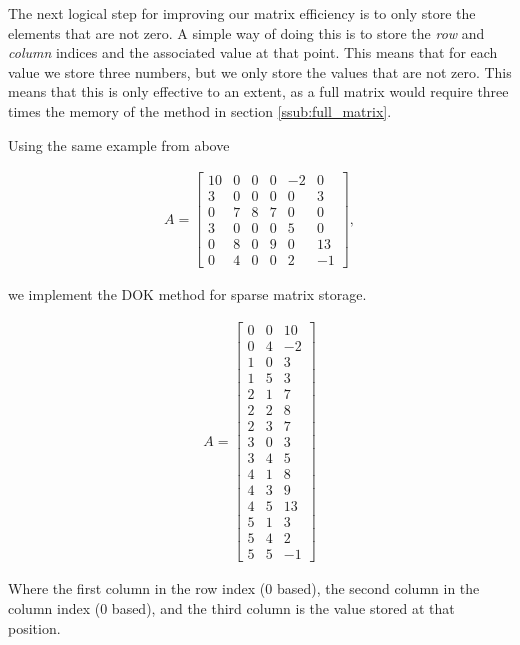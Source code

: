 \documentclass[../fem.tex]{subfiles}
\begin{document}
The next logical step for improving our matrix efficiency is to only store the
elements that are not zero. A simple way of doing this is to store the
\textit{row} and \textit{column} indices and the associated value at that
point. This means that for each value we store three numbers, but we only store
the values that are not zero. This means that this is only effective to an
extent, as a full matrix would require three times the memory of the method in
section \ref{ssub:full_matrix}.

Using the same example from above

\begin{align*}
  A = \begin{bmatrix}
    10 & 0 & 0 & 0 & -2 & 0 \\
    3 & 0 & 0 & 0 & 0 & 3 \\
    0 & 7 & 8 & 7 & 0 & 0 \\
    3 & 0 & 0 & 0 & 5 & 0 \\
    0 & 8 & 0 & 9 & 0 & 13 \\
    0 & 4 & 0 & 0 & 2 & -1
  \end{bmatrix},
\end{align*}

we implement the DOK method for sparse matrix storage.

\begin{align*}
  A = \begin{bmatrix}
    0 & 0 & 10 \\
    0 & 4 & -2 \\
    1 & 0 & 3 \\
    1 & 5 & 3 \\
    2 & 1 & 7 \\
    2 & 2 & 8 \\
    2 & 3 & 7 \\
    3 & 0 & 3 \\
    3 & 4 & 5 \\
    4 & 1 & 8 \\
    4 & 3 & 9 \\
    4 & 5 & 13 \\
    5 & 1 & 3 \\
    5 & 4 & 2 \\
    5 & 5 & -1
  \end{bmatrix}
\end{align*}

Where the first column in the row index ($0$ based), the second column in the
column index ($0$ based), and the third column is the value stored at that
position.
\end{document}
